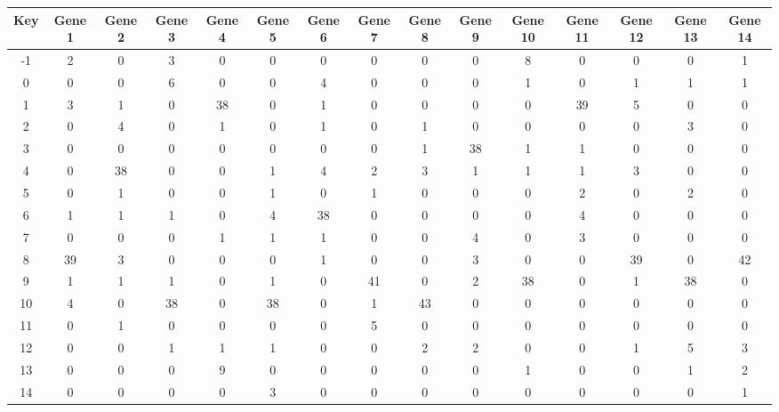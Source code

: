 \begin{tabular}{|c|c|c|c|c|c|c|c|c|c|c|c|c|c|c|}
\hline
Key & Gene 1 & Gene 2 & Gene 3 & Gene 4 & Gene 5 & Gene 6 & Gene 7 & Gene 8 & Gene 9 & Gene 10 & Gene 11 & Gene 12 & Gene 13 & Gene 14 \\
\hline
-1 & 2 & 0 & 3 & 0 & 0 & 0 & 0 & 0 & 0 & 8 & 0 & 0 & 0 & 1 \\
0 & 0 & 0 & 6 & 0 & 0 & 4 & 0 & 0 & 0 & 1 & 0 & 1 & 1 & 1 \\
1 & 3 & 1 & 0 & 38 & 0 & 1 & 0 & 0 & 0 & 0 & 39 & 5 & 0 & 0 \\
2 & 0 & 4 & 0 & 1 & 0 & 1 & 0 & 1 & 0 & 0 & 0 & 0 & 3 & 0 \\
3 & 0 & 0 & 0 & 0 & 0 & 0 & 0 & 1 & 38 & 1 & 1 & 0 & 0 & 0 \\
4 & 0 & 38 & 0 & 0 & 1 & 4 & 2 & 3 & 1 & 1 & 1 & 3 & 0 & 0 \\
5 & 0 & 1 & 0 & 0 & 1 & 0 & 1 & 0 & 0 & 0 & 2 & 0 & 2 & 0 \\
6 & 1 & 1 & 1 & 0 & 4 & 38 & 0 & 0 & 0 & 0 & 4 & 0 & 0 & 0 \\
7 & 0 & 0 & 0 & 1 & 1 & 1 & 0 & 0 & 4 & 0 & 3 & 0 & 0 & 0 \\
8 & 39 & 3 & 0 & 0 & 0 & 1 & 0 & 0 & 3 & 0 & 0 & 39 & 0 & 42 \\
9 & 1 & 1 & 1 & 0 & 1 & 0 & 41 & 0 & 2 & 38 & 0 & 1 & 38 & 0 \\
10 & 4 & 0 & 38 & 0 & 38 & 0 & 1 & 43 & 0 & 0 & 0 & 0 & 0 & 0 \\
11 & 0 & 1 & 0 & 0 & 0 & 0 & 5 & 0 & 0 & 0 & 0 & 0 & 0 & 0 \\
12 & 0 & 0 & 1 & 1 & 1 & 0 & 0 & 2 & 2 & 0 & 0 & 1 & 5 & 3 \\
13 & 0 & 0 & 0 & 9 & 0 & 0 & 0 & 0 & 0 & 1 & 0 & 0 & 1 & 2 \\
14 & 0 & 0 & 0 & 0 & 3 & 0 & 0 & 0 & 0 & 0 & 0 & 0 & 0 & 1 \\
\hline
\end{tabular}